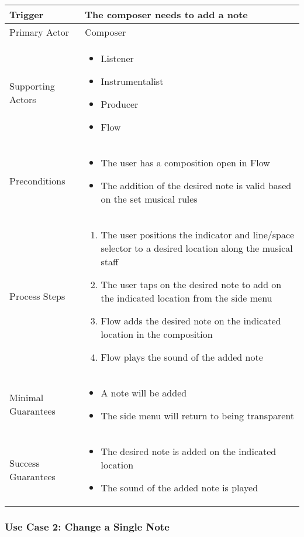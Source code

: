 \begin{tabularx}{\textwidth}{|X|X|}
\hline
Trigger & The composer needs to add a note \\
\hline
Primary Actor & 
Composer \\
\hline
Supporting Actors & 
\begin{itemize}
\item Listener
\item Instrumentalist
\item Producer
\item Flow
\end{itemize} \\
\hline
Preconditions & 
\begin{itemize}
\item The user has a composition open in Flow 
\item The addition of the desired note is valid based on the set musical rules
\end{itemize} \\
\hline
Process Steps & 
\begin{enumerate}
\item The user positions the indicator and line/space selector to a desired location along the musical staff
\item The user taps on the desired note to add on the indicated location from the side menu
\item Flow adds the desired note on the indicated location in the composition
\item Flow plays the sound of the added note
\end{enumerate} \\
\hline
Minimal Guarantees & 
\begin{itemize}
  \item A note will be added
  \item The side menu will return to being transparent
\end{itemize} \\
\hline
Success Guarantees & 
\begin{itemize}
\item The desired note is added on the indicated location
\item The sound of the added note is played
\end{itemize} \\
\hline
\end{tabularx}

\subsubsection{Use Case 2: Change a Single Note}

